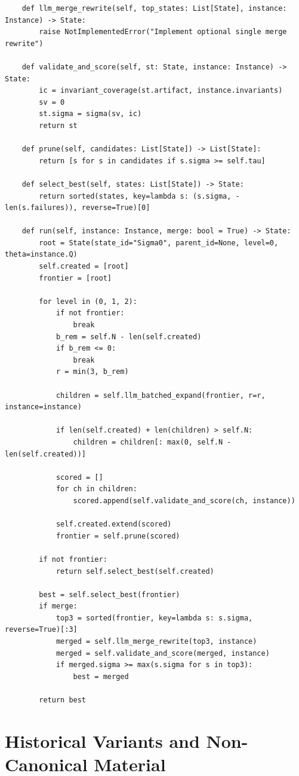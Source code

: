 \documentclass[11pt,a4paper]{article}
\numberwithin{equation}{section}
\theoremstyle{definition}
\begin{document}
\begin{verbatim}
    def llm_merge_rewrite(self, top_states: List[State], instance: Instance) -> State:
        raise NotImplementedError("Implement optional single merge rewrite")

    def validate_and_score(self, st: State, instance: Instance) -> State:
        ic = invariant_coverage(st.artifact, instance.invariants)
        sv = 0
        st.sigma = sigma(sv, ic)
        return st

    def prune(self, candidates: List[State]) -> List[State]:
        return [s for s in candidates if s.sigma >= self.tau]

    def select_best(self, states: List[State]) -> State:
        return sorted(states, key=lambda s: (s.sigma, -len(s.failures)), reverse=True)[0]

    def run(self, instance: Instance, merge: bool = True) -> State:
        root = State(state_id="Sigma0", parent_id=None, level=0, theta=instance.Q)
        self.created = [root]
        frontier = [root]

        for level in (0, 1, 2):
            if not frontier:
                break
            b_rem = self.N - len(self.created)
            if b_rem <= 0:
                break
            r = min(3, b_rem)

            children = self.llm_batched_expand(frontier, r=r, instance=instance)

            if len(self.created) + len(children) > self.N:
                children = children[: max(0, self.N - len(self.created))]

            scored = []
            for ch in children:
                scored.append(self.validate_and_score(ch, instance))

            self.created.extend(scored)
            frontier = self.prune(scored)

        if not frontier:
            return self.select_best(self.created)

        best = self.select_best(frontier)
        if merge:
            top3 = sorted(frontier, key=lambda s: s.sigma, reverse=True)[:3]
            merged = self.llm_merge_rewrite(top3, instance)
            merged = self.validate_and_score(merged, instance)
            if merged.sigma >= max(s.sigma for s in top3):
                best = merged

        return best
\end{verbatim}

\section{Historical Variants and Non-Canonical Material}
\label{app:historical}
\end{document}
